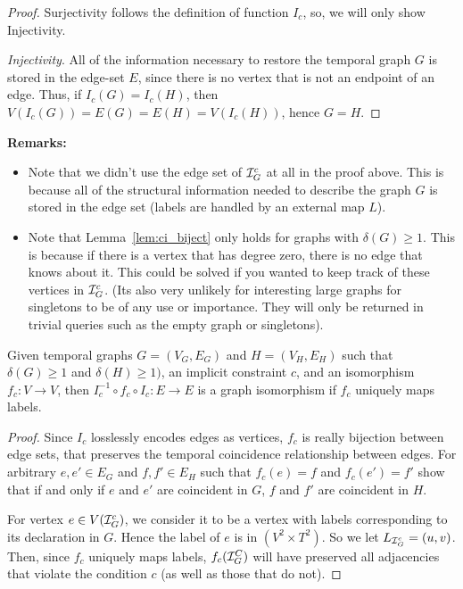 \begin{proof}[Proof] Surjectivity follows the definition of function $I_c$, so,
  we will only show Injectivity.
  
  \textit{Injectivity}. All of the information necessary to restore the temporal
  graph $G$ is stored in the edge-set $E$, since there is no vertex that is not
  an endpoint of an edge. Thus, if $I_c(G) = I_c(H)$, then $V(I_c(G)) = E(G) =
  E(H) = V(I_c(H))$, hence $G = H$.
\end{proof}

\noindent \textbf{Remarks:}
\begin{itemize}
  \item Note that we didn't use the edge set of $\mathcal{I}^c_G$ at all in the proof
    above. This is because all of the structural information needed to describe
    the graph $G$ is stored in the edge set (labels are handled by an external
    map $L$).
  \item Note that Lemma~\ref{lem:ci_biject} only holds for graphs with
    $\delta(G) \geq 1$. This is because if there is a vertex that has degree
    zero, there is no edge that knows about it. This could be solved if you
    wanted to keep track of these vertices in $\mathcal{I}^c_G$. (Its also very unlikely
    for interesting large graphs for singletons to be of any use or
    importance. They will only be returned in trivial queries such as the empty
    graph or singletons).
\end{itemize}

\begin{corollary}
  Given temporal graphs $G = (V_G, E_G)$ and $H = (V_H, E_H)$ such that
  $\delta(G) \geq 1$ and $\delta(H) \geq 1)$, an implicit constraint $c$, and
  an isomorphism $f_c : V \to V$, then $I_c^{-1} \circ f_c \circ I_c : E \to E$
  is a graph isomorphism if $f_c$ uniquely maps labels.
\end{corollary}

\begin{proof}
  Since $I_c$ losslessly encodes edges as vertices, $f_c$ is really bijection
  between edge sets, that preserves the temporal coincidence relationship
  between edges.  For arbitrary $e,e' \in E_G$ and $f,f'\in E_H$ such that
  $f_c(e) = f$ and $f_c(e') = f'$ show that if and only if $e$ and $e'$ are
  coincident in $G$, $f$ and $f'$ are coincident in $H$.

  For vertex $e \in V(\mathcal{I}_G^c)$, we consider it to be a vertex with labels
  corresponding to its declaration in $G$. Hence the label of $e$ is in $(V^2
  \times T^2)$. So we let $L_{\mathcal{I}_G^c} = \left(u, v \right)$. Then, since $f_c$
  uniquely maps labels, $f_c(\mathcal{I}_G^C)$ will have preserved all adjacencies that
  violate the condition $c$ (as well as those that do not).
\end{proof}

